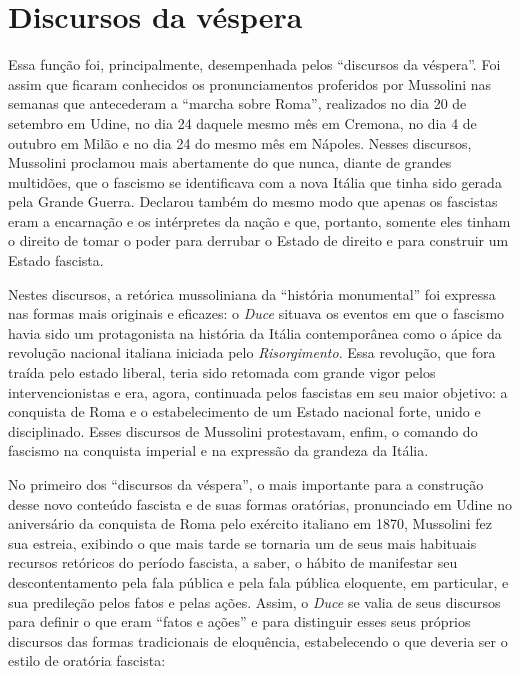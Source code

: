 \section{Discursos da véspera}

Essa função foi, principalmente, desempenhada pelos ``discursos da
véspera''. Foi assim que ficaram conhecidos os pronunciamentos proferidos
por Mussolini nas semanas que antecederam a ``marcha sobre Roma'',
realizados no dia 20 de setembro em Udine, no dia 24 daquele mesmo mês
em Cremona, no dia 4 de outubro em Milão e no dia 24 do mesmo mês em
Nápoles. Nesses discursos, Mussolini proclamou mais abertamente do que
nunca, diante de grandes multidões, que o fascismo se identificava com a
nova Itália que tinha sido gerada pela Grande Guerra. Declarou também do
mesmo modo que apenas os fascistas eram a encarnação e os intérpretes da
nação e que, portanto, somente eles tinham o direito de tomar o poder
para derrubar o Estado de direito e para construir um Estado fascista.

Nestes discursos, a retórica mussoliniana da ``história monumental'' foi
expressa nas formas mais originais e eficazes: o \emph{Duce} situava os
eventos em que o fascismo havia sido um protagonista na história da
Itália contemporânea como o ápice da revolução nacional italiana
iniciada pelo \emph{Risorgimento}. Essa revolução, que fora traída pelo
estado liberal, teria sido retomada com grande vigor pelos
intervencionistas e era, agora, continuada pelos fascistas em seu maior
objetivo: a conquista de Roma e o estabelecimento de um Estado nacional
forte, unido e disciplinado. Esses discursos de Mussolini protestavam,
enfim, o comando do fascismo na conquista imperial e na expressão da
grandeza da Itália.

No primeiro dos ``discursos da véspera'', o mais importante para a
construção desse novo conteúdo fascista e de suas formas oratórias,
pronunciado em Udine no aniversário da conquista de Roma pelo exército
italiano em 1870, Mussolini fez sua estreia, exibindo o que mais tarde
se tornaria um de seus mais habituais recursos retóricos do período
fascista, a saber, o hábito de manifestar seu descontentamento pela fala
pública e pela fala pública eloquente, em particular, e sua predileção
pelos fatos e pelas ações. Assim, o \emph{Duce} se valia de seus
discursos para definir o que eram ``fatos e ações'' e para distinguir
esses seus próprios discursos das formas tradicionais de eloquência,
estabelecendo o que deveria ser o estilo de oratória fascista:

